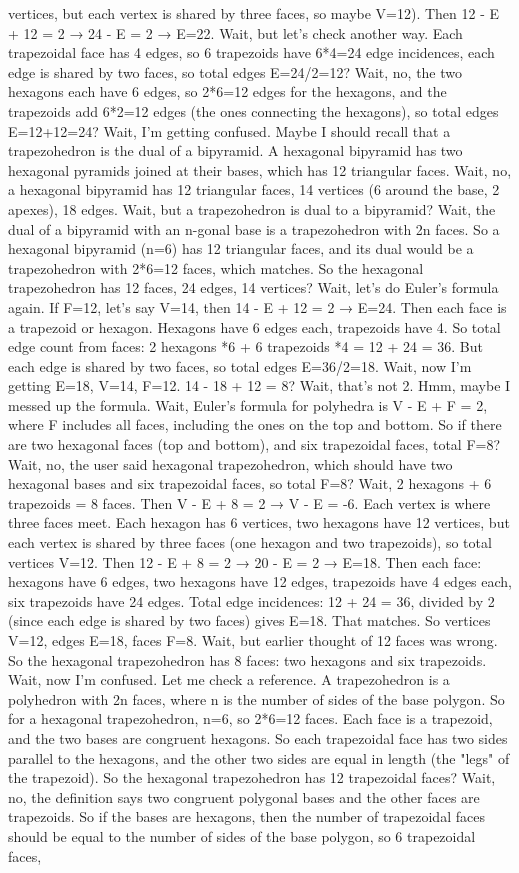 vertices, but each vertex is shared by three faces, so maybe V=12). Then 12 - E + 12 = 2 → 24 - E = 2 → E=22. Wait, but let's check another way. Each trapezoidal face has 4 edges, so 6 trapezoids have 6*4=24 edge incidences, each edge is shared by two faces, so total edges E=24/2=12? Wait, no, the two hexagons each have 6 edges, so 2*6=12 edges for the hexagons, and the trapezoids add 6*2=12 edges (the ones connecting the hexagons), so total edges E=12+12=24? Wait, I'm getting confused. Maybe I should recall that a trapezohedron is the dual of a bipyramid. A hexagonal bipyramid has two hexagonal pyramids joined at their bases, which has 12 triangular faces. Wait, no, a hexagonal bipyramid has 12 triangular faces, 14 vertices (6 around the base, 2 apexes), 18 edges. Wait, but a trapezohedron is dual to a bipyramid? Wait, the dual of a bipyramid with an n-gonal base is a trapezohedron with 2n faces. So a hexagonal bipyramid (n=6) has 12 triangular faces, and its dual would be a trapezohedron with 2*6=12 faces, which matches. So the hexagonal trapezohedron has 12 faces, 24 edges, 14 vertices? Wait, let's do Euler's formula again. If F=12, let's say V=14, then 14 - E + 12 = 2 → E=24. Then each face is a trapezoid or hexagon. Hexagons have 6 edges each, trapezoids have 4. So total edge count from faces: 2 hexagons *6 + 6 trapezoids *4 = 12 + 24 = 36. But each edge is shared by two faces, so total edges E=36/2=18. Wait, now I'm getting E=18, V=14, F=12. 14 - 18 + 12 = 8? Wait, that's not 2. Hmm, maybe I messed up the formula. Wait, Euler's formula for polyhedra is V - E + F = 2, where F includes all faces, including the ones on the top and bottom. So if there are two hexagonal faces (top and bottom), and six trapezoidal faces, total F=8? Wait, no, the user said hexagonal trapezohedron, which should have two hexagonal bases and six trapezoidal faces, so total F=8? Wait, 2 hexagons + 6 trapezoids = 8 faces. Then V - E + 8 = 2 → V - E = -6. Each vertex is where three faces meet. Each hexagon has 6 vertices, two hexagons have 12 vertices, but each vertex is shared by three faces (one hexagon and two trapezoids), so total vertices V=12. Then 12 - E + 8 = 2 → 20 - E = 2 → E=18. Then each face: hexagons have 6 edges, two hexagons have 12 edges, trapezoids have 4 edges each, six trapezoids have 24 edges. Total edge incidences: 12 + 24 = 36, divided by 2 (since each edge is shared by two faces) gives E=18. That matches. So vertices V=12, edges E=18, faces F=8. Wait, but earlier thought of 12 faces was wrong. So the hexagonal trapezohedron has 8 faces: two hexagons and six trapezoids. Wait, now I'm confused. Let me check a reference. A trapezohedron is a polyhedron with 2n faces, where n is the number of sides of the base polygon. So for a hexagonal trapezohedron, n=6, so 2*6=12 faces. Each face is a trapezoid, and the two bases are congruent hexagons. So each trapezoidal face has two sides parallel to the hexagons, and the other two sides are equal in length (the "legs" of the trapezoid). So the hexagonal trapezohedron has 12 trapezoidal faces? Wait, no, the definition says two congruent polygonal bases and the other faces are trapezoids. So if the bases are hexagons, then the number of trapezoidal faces should be equal to the number of sides of the base polygon, so 6 trapezoidal faces, 